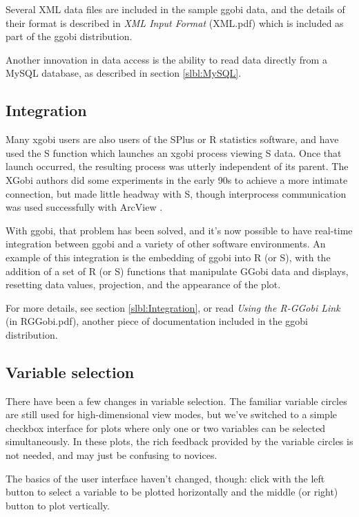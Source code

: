 \documentclass[11pt]{article}
\begin{document}
Several XML data files are included in the sample ggobi data, and
the details of their format is described in {\em XML Input Format}
(XML.pdf) which is included as part of the ggobi distribution.

Another innovation in data access is the ability to read data
directly from a MySQL database, as described in section \ref{slbl:MySQL}.

\subsection{Integration}

Many xgobi users are also users of the SPlus or R statistics software, and
have used the S function which launches an xgobi process viewing S data.
Once that launch occurred, the resulting process was utterly independent
of its parent.  The XGobi authors did some experiments in the early 90s
to achieve a more intimate connection, but made little headway with S,
though interprocess communication was used successfully with ArcView
\cite{SwayneBujaHubbell91,SMCM97}.

With ggobi, that problem has been solved, and it's now possible
to have real-time integration between ggobi and a variety of
other software environments.  An example of this integration is
the embedding of ggobi into R (or S), with the addition of a set of
R (or S) functions that manipulate GGobi data and displays,
resetting data values, projection, and the appearance of the plot.

For more details, see section \ref{slbl:Integration}, or read
{\em Using the R-GGobi Link} (in RGGobi.pdf), another piece of
documentation included in the ggobi distribution.

\subsection {Variable selection}

There have been a few changes in variable selection.  The familiar
variable circles are still used for high-dimensional view modes, but
we've switched to a simple checkbox interface for plots where only one
or two variables can be selected simultaneously.  In these plots, the
rich feedback provided by the variable circles is not needed, and may
just be confusing to novices.

The basics of the user interface haven't changed, though:
click with the left button to select a variable to be plotted
horizontally and the middle (or right) button to plot vertically.
\end{document}
